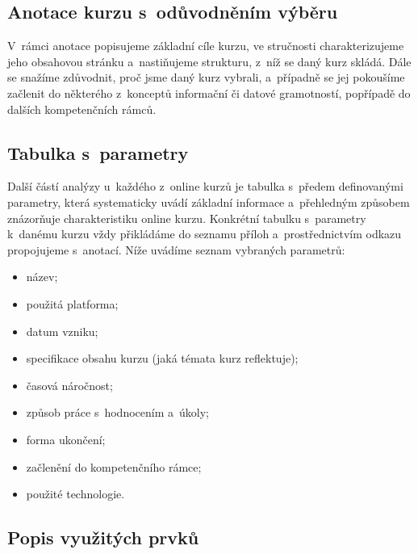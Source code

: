 \hypertarget{anotace-kurzu-s-odux16fvodnux11bnuxedm-vuxfdbux11bru}{%
\subsection{Anotace kurzu s~odůvodněním výběru}\label{anotace-kurzu-s-odux16fvodnux11bnuxedm-vuxfdbux11bru}}

V~rámci anotace popisujeme základní cíle kurzu, ve stručnosti charakterizujeme jeho obsahovou stránku a~nastiňujeme strukturu, z~níž se daný kurz skládá. Dále se snažíme zdůvodnit, proč jsme daný kurz vybrali, a~případně se jej pokoušíme začlenit do některého z~konceptů informační či datové gramotností, popřípadě do dalších kompetenčních rámců.

\hypertarget{tabulka-s-parametry}{%
\subsection{Tabulka s~parametry}\label{tabulka-s-parametry}}

Další částí analýzy u~každého z~online kurzů je tabulka s~předem definovanými parametry, která systematicky uvádí základní informace a~přehledným způsobem znázorňuje charakteristiku online kurzu. Konkrétní tabulku s~parametry k~danému kurzu vždy přikládáme do seznamu příloh a~prostřednictvím odkazu propojujeme s~anotací. Níže uvádíme seznam vybraných parametrů:

\begin{itemize}
\tightlist
\item
  název;
\item
  použitá platforma;
\item
  datum vzniku;
\item
  specifikace obsahu kurzu (jaká témata kurz reflektuje);
\item
  časová náročnost;
\item
  způsob práce s~hodnocením a~úkoly;
\item
  forma ukončení;
\item
  začlenění do kompetenčního rámce;
\item
  použité technologie.
\end{itemize}

\hypertarget{popis-vyuux17eituxfdch-prvkux16f}{%
\subsection{Popis využitých prvků}\label{popis-vyuux17eituxfdch-prvkux16f}}

